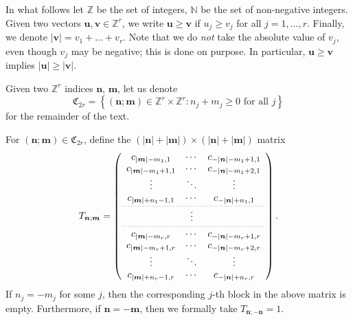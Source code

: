\documentclass[reqno,centertags,11pt,draft]{amsart}
\newcommand{\Z}{\mathbb{Z}}
\newcommand{\N}{\mathbb{N}}
\newcommand{\abs}[1]{\left|#1\right|}
\begin{document}

In what follows let $\Z$ be the set of integers, $\N$ be the set of non-negative integers. Given two vectors $\bm{u},\bm{v}\in \Z^r$, we write $\bm{u}\ge \bm{v}$ if $u_j\ge v_j$ for all $j=1,\ldots,r$.
Finally, we denote $|\bm{v}| = v_1+\ldots + v_r$. Note that we do {\it not} take the absolute value of $v_j$, even though $v_j$ may be negative; this is done on purpose. In particular, $\bm{u}\ge \bm{v}$ implies $|\bm{u}|\ge |\bm{v}|$.

Given two $\Z^r$ indices $\bm{n}$, $\bm{m}$, let us denote 
\begin{equation}
     \mathfrak{C}_{2r}
     =
     \left\{
     (\bm{n};\bm{m}) \in\Z^r\times\Z^r : 
     n_j+m_j\ge 0 \mbox{ for all } j
     \right\}
\end{equation}
for the remainder of the text.
    
For $(\bm{n};\bm{m})\in\mathfrak{C}_{2r}$, define the $(|\bm{n}|+|\bm{m}|)\times (|\bm{n}|+|\bm{m}|)$ matrix
\begin{equation}\label{eq:T}
    T_{\bm{n};\bm{m}} =\left( \begin{array}{ccc}
        c_{\abs{\bm{m}}-m_1,1} & \cdots & c_{-\abs{\bm{n}}-m_1+1,1} \\
        c_{\abs{\bm{m}}-m_1+1,1} & \cdots & c_{-\abs{\bm{n}}-m_1+2,1} \\
        \vdots & \ddots & \vdots \\
        c_{\abs{\bm{m}}+n_1-1,1} & \cdots & c_{-\abs{\bm{n}}+n_1,1} 
        \\[0.2em]
        \hdashline[0.5pt/2pt]
        \\[-1.2em]
        & \vdots \\[0.2em]
        \hdashline[0.5pt/2pt]
        \\[-1.0em]
        c_{\abs{\bm{m}}-m_r,r} & \cdots & c_{-\abs{\bm{n}}-m_r+1,r} \\
        c_{\abs{\bm{m}}-m_r+1,r} & \cdots & c_{-\abs{\bm{n}}-m_r+2,r} \\
        \vdots & \ddots & \vdots \\
        c_{\abs{\bm{m}}+n_r-1,r} & \cdots & c_{-\abs{\bm{n}}+n_r,r}
    \end{array}\right). 
\end{equation}
If $n_j=-m_j$ for some $j$, then the corresponding $j$-th block in the above matrix is empty. Furthermore, if $\bm{n}=-\bm{m}$, then we formally take $T_{\bm{n};-\bm{n}} = 1$.
\end{document}

